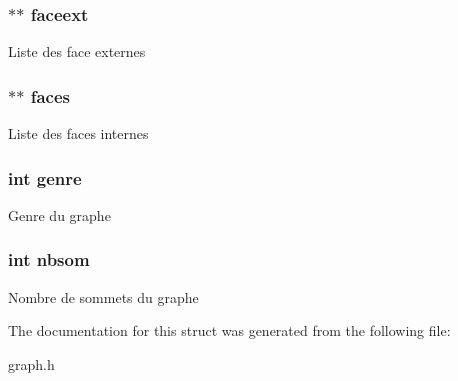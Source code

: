 \subsubsection[{faceext}]{$\ast$$\ast$ faceext}\label{struct_graph_a2632e9b7368ac6ede2362641736b409b}
Liste des face externes \hypertarget{struct_graph_aadfb4851647547eb2cf7c5756ac1a13e}{}
\subsubsection[{faces}]{$\ast$$\ast$ faces}\label{struct_graph_aadfb4851647547eb2cf7c5756ac1a13e}
Liste des faces internes \hypertarget{struct_graph_adf148280bfaf314807caf4206cbc9049}{}
\subsubsection[{genre}]{\setlength{\rightskip}{0pt plus 5cm}int genre}\label{struct_graph_adf148280bfaf314807caf4206cbc9049}
Genre du graphe \hypertarget{struct_graph_a86ce04d133292adc1adeed43958d5893}{}
\subsubsection[{nbsom}]{\setlength{\rightskip}{0pt plus 5cm}int nbsom}\label{struct_graph_a86ce04d133292adc1adeed43958d5893}
Nombre de sommets du graphe 

The documentation for this struct was generated from the following file\+:\begin{DoxyCompactItemize}
\item 
graph.\+h\end{DoxyCompactItemize}
